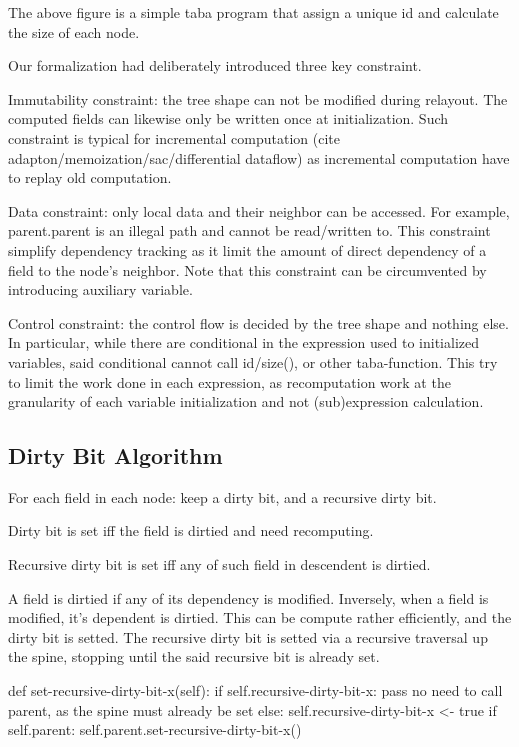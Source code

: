 \documentclass[format=acmsmall, review=false, screen=true]{acmart}
\begin{document}
The above figure is a simple taba program that assign a unique id and calculate the size of each node.

Our formalization had deliberately introduced three key constraint.

Immutability constraint: the tree shape can not be modified during relayout. The computed fields can likewise only be written once at initialization. Such constraint is typical for incremental computation (cite adapton/memoization/sac/differential dataflow) as incremental computation have to replay old computation. 

Data constraint: only local data and their neighbor can be accessed. For example, parent.parent is an illegal path and cannot be read/written to. This constraint simplify dependency tracking as it limit the amount of direct dependency of a field to the node's neighbor. Note that this constraint can be circumvented by introducing auxiliary variable.

Control constraint: the control flow is decided by the tree shape and nothing else. In particular, while there are conditional in the expression used to initialized variables, said conditional cannot call id/size(), or other taba-function. This try to limit the work done in each expression, as recomputation work at the granularity of each variable initialization and not (sub)expression calculation.

\subsection{Dirty Bit Algorithm}
For each field in each node: keep a dirty bit, and a recursive dirty bit.

Dirty bit is set iff the field is dirtied and need recomputing.

Recursive dirty bit is set iff any of such field in descendent is dirtied.

A field is dirtied if any of its dependency is modified. Inversely, when a field is modified, it's dependent is dirtied. This can be compute rather efficiently, and the dirty bit is setted. The recursive dirty bit is setted via a recursive traversal up the spine, stopping until the said recursive bit is already set.

def set-recursive-dirty-bit-x(self):
  if self.recursive-dirty-bit-x:
    pass no need to call parent, as the spine must already be set
  else:
    self.recursive-dirty-bit-x <- true
    if self.parent:
      self.parent.set-recursive-dirty-bit-x()
\end{document}
